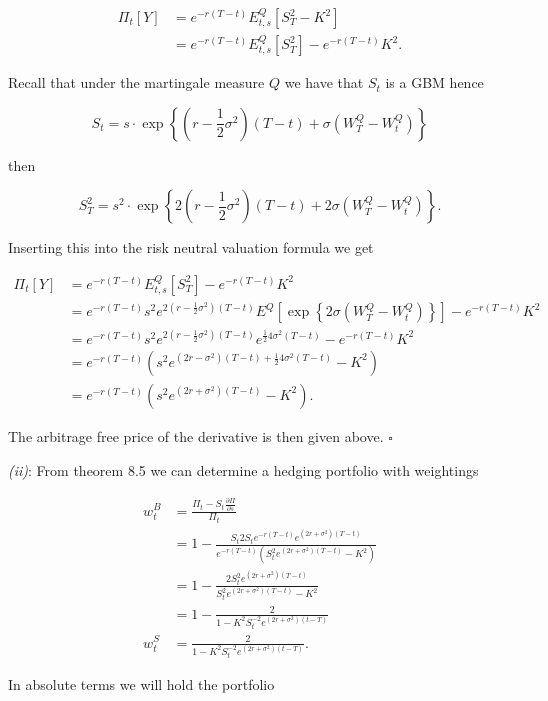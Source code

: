 \documentclass[
]{book}
\begin{document}
\begin{align*}
\Pi_t[Y]&=e^{-r(T-t)}E^Q_{t,s}[S_T^2-K^2]\\
&=e^{-r(T-t)}E^Q_{t,s}[S_T^2]-e^{-r(T-t)}K^2.
\end{align*}

Recall that under the martingale measure \(Q\) we have that \(S_t\) is a GBM hence

\[
S_t=s\cdot \exp\left\{\left(r-\frac{1}{2}\sigma^2\right)(T-t)+\sigma\left(W_T^Q-W_t^Q\right)\right\}
\]

then

\[
S_T^2=s^2\cdot \exp\left\{2\left(r-\frac{1}{2}\sigma^2\right)(T-t)+2\sigma\left(W_T^Q-W_t^Q\right)\right\}.
\]

Inserting this into the risk neutral valuation formula we get

\begin{align*}
\Pi_t[Y]&=e^{-r(T-t)}E^Q_{t,s}[S_T^2]-e^{-r(T-t)}K^2\\
&=e^{-r(T-t)}s^2e^{2\left(r-\frac{1}{2}\sigma^2\right)(T-t)} E^Q\left[\exp\left\{2\sigma\left(W_T^Q-W_t^Q\right)\right\}\right]-e^{-r(T-t)}K^2\\
&=e^{-r(T-t)}s^2e^{2\left(r-\frac{1}{2}\sigma^2\right)(T-t)}e^{\frac{1}{2}4\sigma^2(T-t)}-e^{-r(T-t)}K^2\\
&=e^{-r(T-t)}\left(s^2e^{(2r-\sigma^2)(T-t)+\frac{1}{2}4\sigma^2(T-t)}-K^2\right)\\
&=e^{-r(T-t)}\left(s^2e^{(2r+\sigma^2)(T-t)}-K^2\right).
\end{align*}

The arbitrage free price of the derivative is then given above. \(\square\)

\emph{(ii)}: From theorem 8.5 we can determine a hedging portfolio with weightings

\begin{align*}
w_t^B&=\frac{\Pi_t-S_t\frac{\partial\Pi}{\partial s}}{\Pi_t}\\
&=1-\frac{S_t2S_te^{-r(T-t)}e^{(2r+\sigma^2)(T-t)}}{e^{-r(T-t)}\left(S_t^2e^{(2r+\sigma^2)(T-t)}-K^2\right)}\\
&=1-\frac{2S_t^2e^{(2r+\sigma^2)(T-t)}}{S_t^2e^{(2r+\sigma^2)(T-t)}-K^2}\\
&=1-\frac{2}{1-K^2S_t^{-2}e^{(2r+\sigma^2)(t-T)}}\\
w_t^S&=\frac{2}{1-K^2S_t^{-2}e^{(2r+\sigma^2)(t-T)}}.
\end{align*}

In absolute terms we will hold the portfolio
\end{document}
